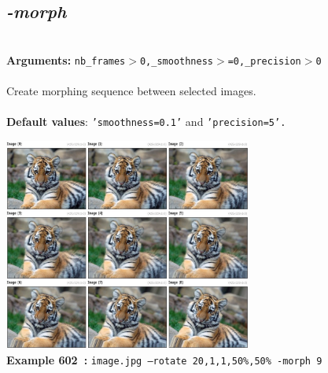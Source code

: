 \documentclass[a4paper,11pt,twoside]{book}
\begin{document}
\subsection{\emph{-morph} }\vspace*{-0.5em}
~\\\textbf{Arguments: } 
{\small \texttt{nb\_frames$>$0,\_smoothness$>$=0,\_precision$>$0}}\\~\\
Create morphing sequence between selected images.
~\\~\\\textbf{Default values}: {\small \texttt{'smoothness=0.1'} and \texttt{'precision=5'.}}
\begin{center}\includegraphics[keepaspectratio=true,height=7cm,width=\textwidth]{img/gmic_def602.jpg}\\
{\footnotesize \textbf{Example 602~:} \texttt{image.jpg --rotate 20,1,1,50\%,50\% -morph 9}}
\end{center}
\end{document}
